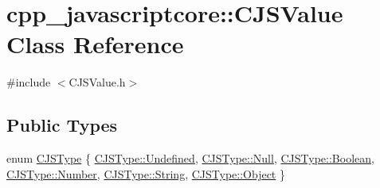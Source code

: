 \hypertarget{classcpp__javascriptcore_1_1_c_j_s_value}{}\section{cpp\+\_\+javascriptcore\+:\+:C\+J\+S\+Value Class Reference}
\label{classcpp__javascriptcore_1_1_c_j_s_value}


{\ttfamily \#include $<$C\+J\+S\+Value.\+h$>$}

\subsection*{Public Types}
\begin{DoxyCompactItemize}
\item 
enum \mbox{\hyperlink{classcpp__javascriptcore_1_1_c_j_s_value_a72505affa6537ee81f1d447fab22a890}{C\+J\+S\+Type}} \{ \newline
\mbox{\hyperlink{classcpp__javascriptcore_1_1_c_j_s_value_a72505affa6537ee81f1d447fab22a890aec0fc0100c4fc1ce4eea230c3dc10360}{C\+J\+S\+Type\+::\+Undefined}}, 
\mbox{\hyperlink{classcpp__javascriptcore_1_1_c_j_s_value_a72505affa6537ee81f1d447fab22a890abbb93ef26e3c101ff11cdd21cab08a94}{C\+J\+S\+Type\+::\+Null}}, 
\mbox{\hyperlink{classcpp__javascriptcore_1_1_c_j_s_value_a72505affa6537ee81f1d447fab22a890a27226c864bac7454a8504f8edb15d95b}{C\+J\+S\+Type\+::\+Boolean}}, 
\mbox{\hyperlink{classcpp__javascriptcore_1_1_c_j_s_value_a72505affa6537ee81f1d447fab22a890ab2ee912b91d69b435159c7c3f6df7f5f}{C\+J\+S\+Type\+::\+Number}}, 
\newline
\mbox{\hyperlink{classcpp__javascriptcore_1_1_c_j_s_value_a72505affa6537ee81f1d447fab22a890a27118326006d3829667a400ad23d5d98}{C\+J\+S\+Type\+::\+String}}, 
\mbox{\hyperlink{classcpp__javascriptcore_1_1_c_j_s_value_a72505affa6537ee81f1d447fab22a890a497031794414a552435f90151ac3b54b}{C\+J\+S\+Type\+::\+Object}}
 \}
\end{DoxyCompactItemize}
